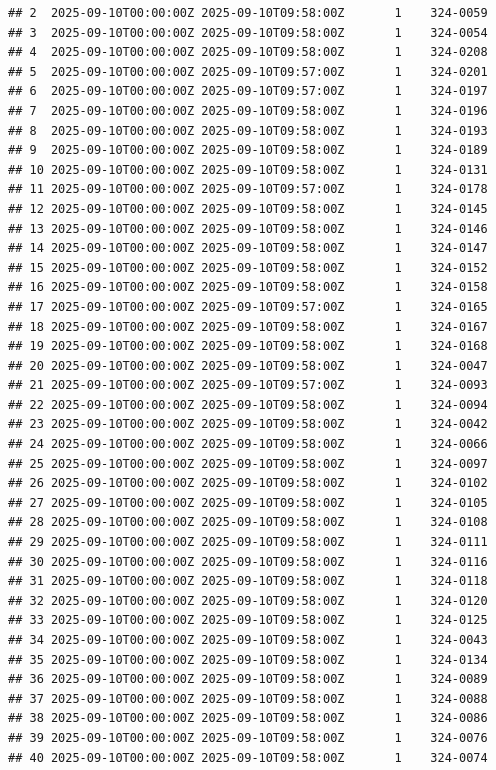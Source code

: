 \documentclass[
]{article}
\begin{document}
\begin{verbatim}
## 2  2025-09-10T00:00:00Z 2025-09-10T09:58:00Z       1    324-0059
## 3  2025-09-10T00:00:00Z 2025-09-10T09:58:00Z       1    324-0054
## 4  2025-09-10T00:00:00Z 2025-09-10T09:58:00Z       1    324-0208
## 5  2025-09-10T00:00:00Z 2025-09-10T09:57:00Z       1    324-0201
## 6  2025-09-10T00:00:00Z 2025-09-10T09:57:00Z       1    324-0197
## 7  2025-09-10T00:00:00Z 2025-09-10T09:58:00Z       1    324-0196
## 8  2025-09-10T00:00:00Z 2025-09-10T09:58:00Z       1    324-0193
## 9  2025-09-10T00:00:00Z 2025-09-10T09:58:00Z       1    324-0189
## 10 2025-09-10T00:00:00Z 2025-09-10T09:58:00Z       1    324-0131
## 11 2025-09-10T00:00:00Z 2025-09-10T09:57:00Z       1    324-0178
## 12 2025-09-10T00:00:00Z 2025-09-10T09:58:00Z       1    324-0145
## 13 2025-09-10T00:00:00Z 2025-09-10T09:58:00Z       1    324-0146
## 14 2025-09-10T00:00:00Z 2025-09-10T09:58:00Z       1    324-0147
## 15 2025-09-10T00:00:00Z 2025-09-10T09:58:00Z       1    324-0152
## 16 2025-09-10T00:00:00Z 2025-09-10T09:58:00Z       1    324-0158
## 17 2025-09-10T00:00:00Z 2025-09-10T09:57:00Z       1    324-0165
## 18 2025-09-10T00:00:00Z 2025-09-10T09:58:00Z       1    324-0167
## 19 2025-09-10T00:00:00Z 2025-09-10T09:58:00Z       1    324-0168
## 20 2025-09-10T00:00:00Z 2025-09-10T09:58:00Z       1    324-0047
## 21 2025-09-10T00:00:00Z 2025-09-10T09:57:00Z       1    324-0093
## 22 2025-09-10T00:00:00Z 2025-09-10T09:58:00Z       1    324-0094
## 23 2025-09-10T00:00:00Z 2025-09-10T09:58:00Z       1    324-0042
## 24 2025-09-10T00:00:00Z 2025-09-10T09:58:00Z       1    324-0066
## 25 2025-09-10T00:00:00Z 2025-09-10T09:58:00Z       1    324-0097
## 26 2025-09-10T00:00:00Z 2025-09-10T09:58:00Z       1    324-0102
## 27 2025-09-10T00:00:00Z 2025-09-10T09:58:00Z       1    324-0105
## 28 2025-09-10T00:00:00Z 2025-09-10T09:58:00Z       1    324-0108
## 29 2025-09-10T00:00:00Z 2025-09-10T09:58:00Z       1    324-0111
## 30 2025-09-10T00:00:00Z 2025-09-10T09:58:00Z       1    324-0116
## 31 2025-09-10T00:00:00Z 2025-09-10T09:58:00Z       1    324-0118
## 32 2025-09-10T00:00:00Z 2025-09-10T09:58:00Z       1    324-0120
## 33 2025-09-10T00:00:00Z 2025-09-10T09:58:00Z       1    324-0125
## 34 2025-09-10T00:00:00Z 2025-09-10T09:58:00Z       1    324-0043
## 35 2025-09-10T00:00:00Z 2025-09-10T09:58:00Z       1    324-0134
## 36 2025-09-10T00:00:00Z 2025-09-10T09:58:00Z       1    324-0089
## 37 2025-09-10T00:00:00Z 2025-09-10T09:58:00Z       1    324-0088
## 38 2025-09-10T00:00:00Z 2025-09-10T09:58:00Z       1    324-0086
## 39 2025-09-10T00:00:00Z 2025-09-10T09:58:00Z       1    324-0076
## 40 2025-09-10T00:00:00Z 2025-09-10T09:58:00Z       1    324-0074

\end{verbatim}
\end{document}
